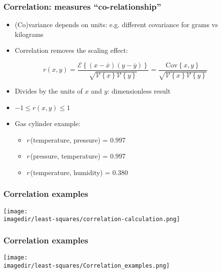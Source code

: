 \begin{frame}\frametitle{Correlation: measures ``co-relationship''}
	\begin{itemize}
		\item	(Co)variance depends on units: e.g. different covariance for grams vs kilograms
		\item	Correlation removes the scaling effect:
	\end{itemize}

	$$r(x, y) = \dfrac{\mathcal{E}\left\{ (x - \overline{x}) (y - \overline{y})\right\}}{\sqrt{\mathcal{V}\left\{x\right\}\mathcal{V}\left\{y\right\}}} = \dfrac{\text{Cov}\left\{x, y\right\}}{\sqrt{\mathcal{V}\left\{x\right\}\mathcal{V}\left\{y\right\}}}$$
	\begin{itemize}
		\item	Divides by the units of $x$ and $y$: dimensionless result
		\item	$-1 \leq r(x,y) \leq 1$
	\end{itemize}
	\begin{itemize}
		\item	Gas cylinder example:
		\begin{itemize}
			\item	\emph{r}\,(temperature, pressure) = 0.997
			\item	\emph{r}\,(pressure, temperature) = 0.997
			\item	\emph{r}\,(temperature, humidity) = 0.380
		\end{itemize}
	\end{itemize}
\end{frame}

\begin{frame}\frametitle{Correlation examples}
	\begin{center}
		\texttt{[image: \\imagedir/least-squares/correlation-calculation.png]}
	\end{center}
\end{frame}

\begin{frame}\frametitle{Correlation examples}
	\begin{center}
		\texttt{[image: \\imagedir/least-squares/Correlation\_examples.png]}
	\end{center}
\end{frame}

